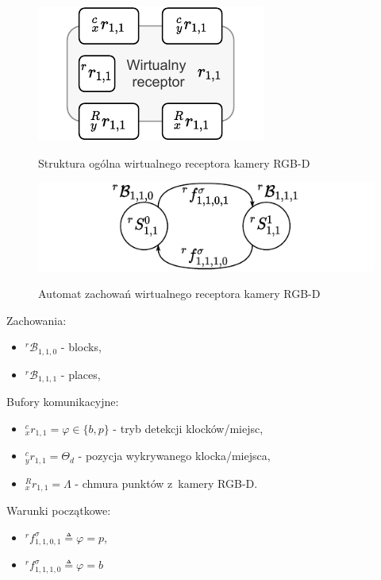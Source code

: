 \begin{figure}
    \centering
    \includegraphics[width=0.75\columnwidth]{figures/ISR-vr-camera-model.pdf}
    \label{fig:model-vr-camera}
    \caption{Struktura ogólna wirtualnego receptora kamery RGB-D}
\end{figure}

\begin{figure}
    \centering
    \includegraphics[width=\columnwidth]{figures/ISR-vr-camera-behaviours.pdf}
    \label{fig:zachowania-vr-camera}
    \caption{Automat zachowań wirtualnego receptora kamery RGB-D}
\end{figure}


Zachowania:
\begin{itemize}
    \item ${}^{r}\mathcal{B}_{1,1,0}$ - blocks,
    \item ${}^{r}\mathcal{B}_{1,1,1}$ - places,
\end{itemize}

Bufory komunikacyjne:
\begin{itemize}
    \item ${}^{c}_{x}r_{1,1} = \varphi \in \{b, p\}$ - tryb detekcji klocków/miejsc,
    \item ${}^{c}_{y}r_{1,1} = \Theta_{d}$ - pozycja wykrywanego klocka/miejsca,
    \item ${}^{R}_{x}r_{1,1} = \Lambda$ - chmura punktów z~kamery RGB-D.
\end{itemize}

Warunki początkowe:
\begin{itemize}
    \item ${}^{r}f^{\sigma}_{1,1,0,1} \triangleq \varphi = p$,
    \item ${}^{r}f^{\sigma}_{1,1,1,0} \triangleq \varphi = b$
\end{itemize}

